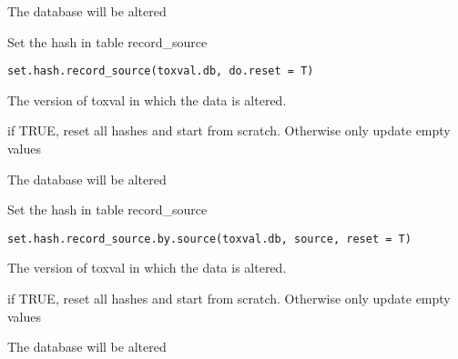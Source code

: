 \documentclass[letterpaper]{book}
\begin{document}
%
\begin{Value}
The database will be altered
\end{Value}
%
\begin{Description}\relax
Set the hash in table record\_source
\end{Description}
%
\begin{Usage}
\begin{verbatim}
set.hash.record_source(toxval.db, do.reset = T)
\end{verbatim}
\end{Usage}
%
\begin{Arguments}
\begin{ldescription}
\item[\code{toxval.db}] The version of toxval in which the data is altered.

\item[\code{do.reset}] if TRUE, reset all hashes and start from scratch.
Otherwise only update empty values
\end{ldescription}
\end{Arguments}
%
\begin{Value}
The database will be altered
\end{Value}
%
\begin{Description}\relax
Set the hash in table record\_source
\end{Description}
%
\begin{Usage}
\begin{verbatim}
set.hash.record_source.by.source(toxval.db, source, reset = T)
\end{verbatim}
\end{Usage}
%
\begin{Arguments}
\begin{ldescription}
\item[\code{toxval.db}] The version of toxval in which the data is altered.

\item[\code{do.reset}] if TRUE, reset all hashes and start from scratch.
Otherwise only update empty values
\end{ldescription}
\end{Arguments}
%
\begin{Value}
The database will be altered
\end{Value}
\end{document}
